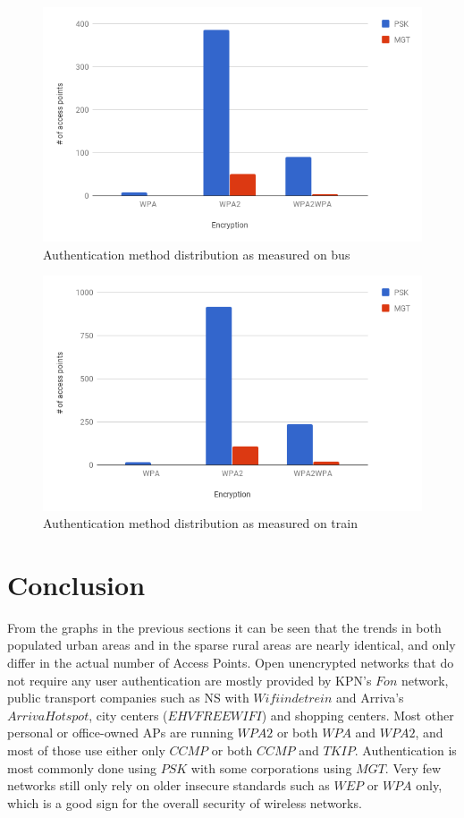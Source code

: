 \documentclass[letterpaper, 10 pt, conference]{ieeeconf}  %
\begin{document}
\begin{figure}[h]
\includegraphics[scale=0.4]{Figures/AuthBus.png}
\caption{Authentication method distribution as measured on bus}
\label{fig:busauth}
\end{figure}


\begin{figure}[h]
\includegraphics[scale=0.4]{Figures/AuthTrain.png}
\caption{Authentication method distribution as measured on train}
\label{fig:trainauth}
\end{figure}


\section{Conclusion}
From the graphs in the previous sections it can be seen that the trends in both populated urban areas and in the sparse rural areas are nearly identical, and only differ in the actual number of Access Points. Open unencrypted networks that do not require any user authentication are mostly provided by KPN's $Fon$ network, public transport companies such as NS with $Wifi in de trein$ and Arriva's $ArrivaHotspot$, city centers ($EHV FREE WIFI$) and shopping centers. Most other personal or office-owned APs are running $WPA2$ or both $WPA$ and $WPA2$, and most of those use either only $CCMP$ or both $CCMP$ and $TKIP$. Authentication is most commonly done using $PSK$ with some corporations using $MGT$. Very few networks still only rely on older insecure standards such as $WEP$ or $WPA$ only, which is a good sign for the overall security of wireless networks.
\end{document}
